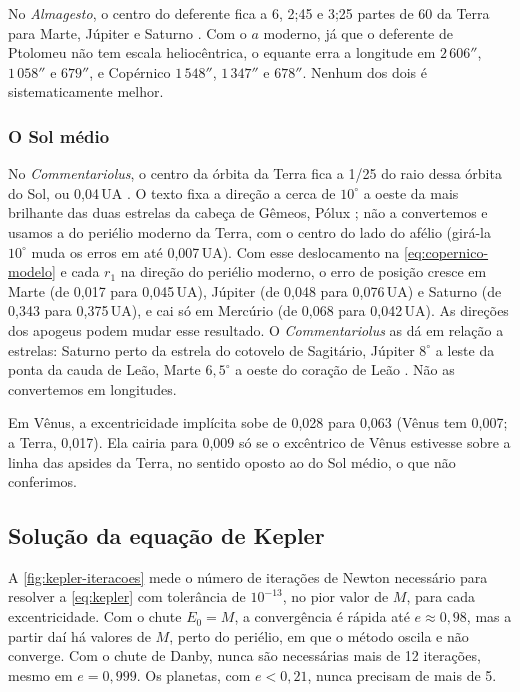 No \emph{Almagesto}, o centro do deferente fica a 6, 2;45 e 3;25 partes de 60 da Terra para Marte, Júpiter e Saturno \cite[p.~494--536]{toomer1984}. Com o $a$ moderno, já que o deferente de Ptolomeu não tem escala heliocêntrica, o equante erra a longitude em $2\,606''$, $1\,058''$ e $679''$, e Copérnico $1\,548''$, $1\,347''$ e $678''$. Nenhum dos dois é sistematicamente melhor.

\subsubsection{O Sol médio}\label{sec:sol-medio}

No \emph{Commentariolus}, o centro da órbita da Terra fica a 1/25 do raio dessa órbita do Sol, ou 0,04\,UA \cite[p.~61]{rosen1939}. O texto fixa a direção a cerca de $10^\circ$ a oeste da mais brilhante das duas estrelas da cabeça de Gêmeos, Pólux \cite[p.~62]{rosen1939}; não a convertemos e usamos a do periélio moderno da Terra, com o centro do lado do afélio (girá-la $10^\circ$ muda os erros em até 0,007\,UA). Com esse deslocamento na \autoref{eq:copernico-modelo} e cada $r_1$ na direção do periélio moderno, o erro de posição cresce em Marte (de 0,017 para 0,045\,UA), Júpiter (de 0,048 para 0,076\,UA) e Saturno (de 0,343 para 0,375\,UA), e cai só em Mercúrio (de 0,068 para 0,042\,UA). As direções dos apogeus podem mudar esse resultado. O \emph{Commentariolus} as dá em relação a estrelas: Saturno perto da estrela do cotovelo de Sagitário, Júpiter $8^\circ$ a leste da ponta da cauda de Leão, Marte $6{,}5^\circ$ a oeste do coração de Leão \cite[p.~76]{rosen1939}. Não as convertemos em longitudes.

Em Vênus, a excentricidade implícita sobe de 0,028 para 0,063 (Vênus tem 0,007; a Terra, 0,017). Ela cairia para 0,009 só se o excêntrico de Vênus estivesse sobre a linha das apsides da Terra, no sentido oposto ao do Sol médio, o que não conferimos.

\subsection{Solução da equação de Kepler}

A \autoref{fig:kepler-iteracoes} mede o número de iterações de Newton necessário para resolver a \autoref{eq:kepler} com tolerância de $10^{-13}$, no pior valor de $M$, para cada excentricidade. Com o chute $E_0 = M$, a convergência é rápida até $e\approx 0{,}98$, mas a partir daí há valores de $M$, perto do periélio, em que o método oscila e não converge. Com o chute de Danby, nunca são necessárias mais de 12 iterações, mesmo em $e = 0{,}999$. Os planetas, com $e < 0{,}21$, nunca precisam de mais de 5.

